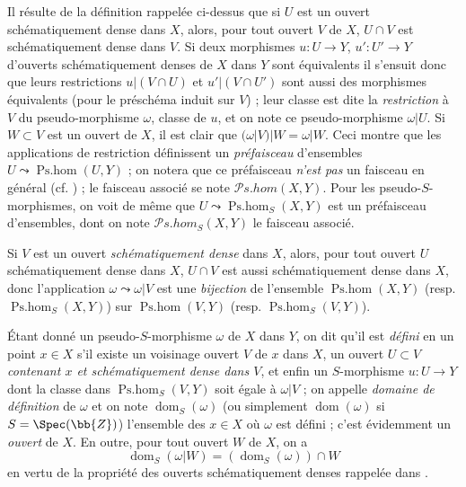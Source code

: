 \begin{env}[20.2.2]
Il résulte de la définition rappelée ci-dessus que si $U$ est un ouvert schématiquement dense dans $X$, alors, pour tout ouvert $V$ de $X$, $U\cap V$ est schématiquement dense dans $V$.
Si deux morphismes $u:U\to Y$, $u':U'\to Y$ d'ouverts schématiquement denses de $X$ dans $Y$ sont équivalents il s'ensuit donc que leurs restrictions $u|(V\cap U)$ et $u'|(V\cap U')$ sont aussi des morphismes équivalents (pour le préschéma induit sur $V$) ; leur classe est dite la \emph{restriction} à $V$ du pseudo-morphisme $\omega$, classe de $u$, et on note ce pseudo-morphisme $\omega|U$.
Si $W\subset V$ est un ouvert de $X$, il est clair que $(\omega|V)|W=\omega|W$.
Ceci montre que les applications de restriction définissent un \emph{préfaisceau} d'ensembles $U\leadsto\operatorname{Ps.hom}(U,Y)$ ; on notera que ce préfaisceau \emph{n'est pas} un faisceau en général (cf. ) ; le faisceau associé se note $\mathscr{P}\!s.\!\mathit{hom}(X,Y)$.
Pour les pseudo-$S$-morphismes, on voit de même que $U\leadsto\operatorname{Ps.hom}_S(X,Y)$ est un préfaisceau d'ensembles, dont on note $\mathscr{P}\!s.\!\mathit{hom}_S(X,Y)$ le faisceau associé.

Si $V$ est un ouvert \emph{schématiquement dense} dans $X$, alors, pour tout ouvert $U$ schématiquement dense dans $X$, $U\cap V$ est aussi schématiquement dense dans $X$, donc l'application $\omega\leadsto\omega|V$ est une \emph{bijection} de l'ensemble $\operatorname{Ps.hom}(X,Y)$ (resp. $\operatorname{Ps.hom}_S(X,Y)$) sur $\operatorname{Ps.hom}(V,Y)$ (resp. $\operatorname{Ps.hom}_S(V,Y)$).
\end{env}

\begin{env}[20.2.3]
Étant donné un pseudo-$S$-morphisme $\omega$ de $X$ dans $Y$, on dit qu'il est \emph{défini} en un point $x\in X$ s'il existe un voisinage ouvert $V$ de $x$ dans $X$, un ouvert $U\subset V$ \emph{contenant $x$ et schématiquement dense dans $V$}, et enfin un $S$-morphisme $u:U\to Y$ dont la classe dans $\operatorname{Ps.hom}_S(V,Y)$ soit égale à $\omega|V$  ; on appelle \emph{domaine de définition} de $\omega$ et on note $\operatorname{dom}_S(\omega)$ (ou simplement $\operatorname{dom}(\omega)$ si $S=\Spec(\bb{Z})$) l'ensemble des $x\in X$ où $\omega$ est défini ; c'est évidemment un \emph{ouvert} de $X$.
En outre, pour tout ouvert $W$ de $X$, on a
\[
\label{IV.20.2.3.1}
  \operatorname{dom}_S(\omega|W)=(\operatorname{dom}_S(\omega))\cap W
  \tag{20.2.3.1}
\]
en vertu de la propriété des ouverts schématiquement denses rappelée dans .
\end{env}

